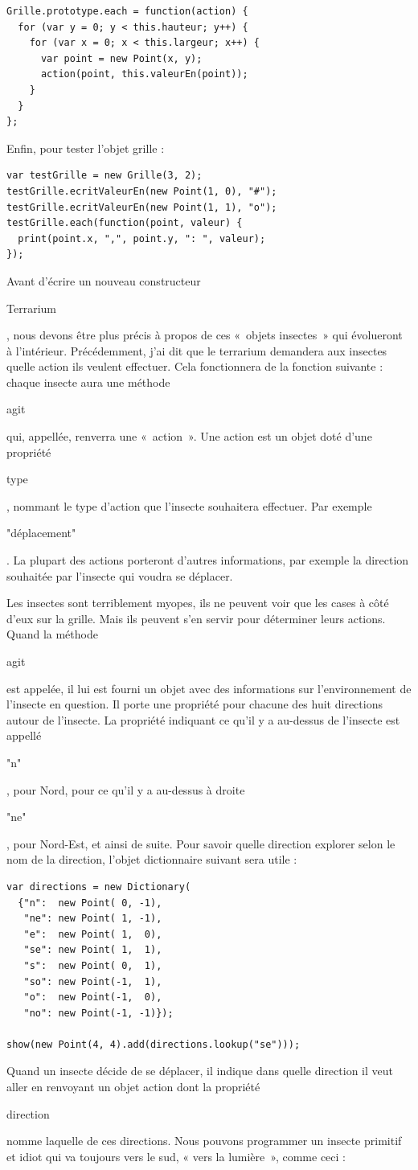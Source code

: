 \documentclass{FramateX}
\renewcommand{\texttt}[1]{\begin{sffamily}{#1}\end{sffamily}}
\begin{document}
\begin{lstlisting}
Grille.prototype.each = function(action) {
  for (var y = 0; y < this.hauteur; y++) {
    for (var x = 0; x < this.largeur; x++) {
      var point = new Point(x, y);
      action(point, this.valeurEn(point));
    }
  }
};
\end{lstlisting}
\begin{center}\end{center}

Enfin, pour tester l'objet grille :

\begin{lstlisting}
var testGrille = new Grille(3, 2);
testGrille.ecritValeurEn(new Point(1, 0), "#");
testGrille.ecritValeurEn(new Point(1, 1), "o");
testGrille.each(function(point, valeur) {
  print(point.x, ",", point.y, ": ", valeur);
});
\end{lstlisting}
\begin{center}\end{center}

Avant d'écrire un nouveau constructeur \texttt{Terrarium}, nous devons
être plus précis à propos de ces «~objets insectes~» qui évolueront à
l'intérieur. Précédemment, j'ai dit que le terrarium demandera aux
insectes quelle action ils veulent effectuer. Cela fonctionnera de la
fonction suivante : chaque insecte aura une méthode \texttt{agit} qui,
appellée, renverra une «~action~». Une action est un objet doté d'une
propriété \texttt{type}, nommant le type d'action que l'insecte
souhaitera effectuer. Par exemple \texttt{"déplacement"}. La plupart des
actions porteront d'autres informations, par exemple la direction
souhaitée par l'insecte qui voudra se déplacer.

Les insectes sont terriblement myopes, ils ne peuvent voir que les cases
à côté d'eux sur la grille. Mais ils peuvent s'en servir pour déterminer
leurs actions. Quand la méthode \texttt{agit} est appelée, il lui est
fourni un objet avec des informations sur l'environnement de l'insecte
en question. Il porte une propriété pour chacune des huit directions
autour de l'insecte. La propriété indiquant ce qu'il y a au-dessus de
l'insecte est appellé \texttt{"n"}, pour Nord, pour ce qu'il y a
au-dessus à droite \texttt{"ne"}, pour Nord-Est, et ainsi de suite. Pour
savoir quelle direction explorer selon le nom de la direction, l'objet
dictionnaire suivant sera utile :

\begin{lstlisting}
var directions = new Dictionary(
  {"n":  new Point( 0, -1),
   "ne": new Point( 1, -1),
   "e":  new Point( 1,  0),
   "se": new Point( 1,  1),
   "s":  new Point( 0,  1),
   "so": new Point(-1,  1),
   "o":  new Point(-1,  0),
   "no": new Point(-1, -1)});

show(new Point(4, 4).add(directions.lookup("se")));
\end{lstlisting}
Quand un insecte décide de se déplacer, il indique dans quelle direction
il veut aller en renvoyant un objet action dont la propriété
\texttt{direction} nomme laquelle de ces directions. Nous pouvons
programmer un insecte primitif et idiot qui va toujours vers le sud, «
vers la lumière~», comme ceci :
\end{document}
